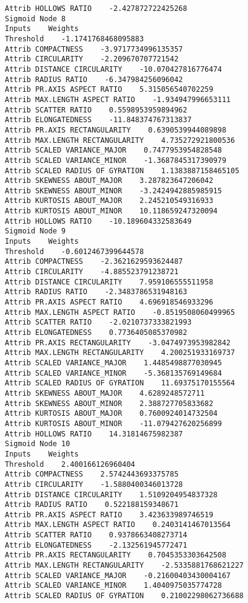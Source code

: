 \documentclass[
	article,			%
	11pt,				%
	oneside,			%
	a4paper,			%
	english,			%
	brazil,				%
	sumario=tradicional
	]{abntex2}
\begin{document}
\begin{lstlisting}
Attrib HOLLOWS RATIO    -2.427872722425268
Sigmoid Node 8
Inputs    Weights
Threshold    -1.1741768468095883
Attrib COMPACTNESS    -3.9717734996135357
Attrib CIRCULARITY    -2.209670707721542
Attrib DISTANCE CIRCULARITY    -10.070427816776474
Attrib RADIUS RATIO    -6.347984256096042
Attrib PR.AXIS ASPECT RATIO    5.315056540702259
Attrib MAX.LENGTH ASPECT RATIO    -1.934947996653111
Attrib SCATTER RATIO    0.5598953959894962
Attrib ELONGATEDNESS    -11.848374767313837
Attrib PR.AXIS RECTANGULARITY    0.6390539944089898
Attrib MAX.LENGTH RECTANGULARITY    4.735272921800536
Attrib SCALED VARIANCE_MAJOR    0.7477953954828548
Attrib SCALED VARIANCE_MINOR    -1.3687845317390979
Attrib SCALED RADIUS OF GYRATION    1.1383887158465105
Attrib SKEWNESS ABOUT_MAJOR    3.287823647206042
Attrib SKEWNESS ABOUT_MINOR    -3.2424942885985915
Attrib KURTOSIS ABOUT_MAJOR    2.245210549316933
Attrib KURTOSIS ABOUT_MINOR    10.118659247320094
Attrib HOLLOWS RATIO    -10.189604332583649
Sigmoid Node 9
Inputs    Weights
Threshold    -0.6012467399644578
Attrib COMPACTNESS    -2.3621629593624487
Attrib CIRCULARITY    -4.885523791238721
Attrib DISTANCE CIRCULARITY    7.959106555511958
Attrib RADIUS RATIO    -2.3483786531948163
Attrib PR.AXIS ASPECT RATIO    4.696918546933296
Attrib MAX.LENGTH ASPECT RATIO    -0.8519508060499965
Attrib SCATTER RATIO    -2.0210737333821993
Attrib ELONGATEDNESS    0.7736405085370982
Attrib PR.AXIS RECTANGULARITY    -3.0474973953982842
Attrib MAX.LENGTH RECTANGULARITY    4.200251933169737
Attrib SCALED VARIANCE_MAJOR    1.4485498877030945
Attrib SCALED VARIANCE_MINOR    -5.368135769149684
Attrib SCALED RADIUS OF GYRATION    11.69375170155564
Attrib SKEWNESS ABOUT_MAJOR    4.6289248572711
Attrib SKEWNESS ABOUT_MINOR    2.388727705833682
Attrib KURTOSIS ABOUT_MAJOR    0.7600924014732504
Attrib KURTOSIS ABOUT_MINOR    -11.079427620256899
Attrib HOLLOWS RATIO    14.31814675982387
Sigmoid Node 10
Inputs    Weights
Threshold    2.400166126960404
Attrib COMPACTNESS    2.5742443693375785
Attrib CIRCULARITY    -1.5880400346013728
Attrib DISTANCE CIRCULARITY    1.5109204954837328
Attrib RADIUS RATIO    0.522188159348671
Attrib PR.AXIS ASPECT RATIO    3.423633989746519
Attrib MAX.LENGTH ASPECT RATIO    0.2403141467013564
Attrib SCATTER RATIO    0.9378663408273714
Attrib ELONGATEDNESS    -2.132561945772471
Attrib PR.AXIS RECTANGULARITY    0.7045353303642508
Attrib MAX.LENGTH RECTANGULARITY    -2.5335881768621227
Attrib SCALED VARIANCE_MAJOR    -0.21600403430004167
Attrib SCALED VARIANCE_MINOR    1.4040975035774728
Attrib SCALED RADIUS OF GYRATION    0.21002298062736688

\end{lstlisting}
\end{document}

